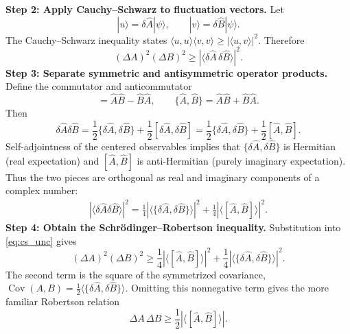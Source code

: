 \documentclass[11pt,a4paper]{article}
\newcommand{\Cov}{\operatorname{Cov}}
\newcommand{\ket}[1]{|#1\rangle}
\newcommand{\abs}[1]{\left|#1\right|}
\begin{document}
\textbf{Step 2: Apply Cauchy--Schwarz to fluctuation vectors.} Let
\begin{equation}
\ket u=\delta\hat A\ket\psi,\qquad \ket v=\delta\hat B\ket\psi.
\end{equation}
The Cauchy--Schwarz inequality states $\langle u,u\rangle\langle v,v\rangle\geq\abs{\langle u,v\rangle}^2$. Therefore
\begin{equation}\label{eq:cs_unc}
\boxed{(\Delta A)^2(\Delta B)^2\geq\abs{\langle\delta\hat A\,\delta\hat B\rangle}^2.}
\end{equation}
\textbf{Step 3: Separate symmetric and antisymmetric operator products.} Define the commutator and anticommutator
\begin{equation}
[\hat A,\hat B]=\hat A\hat B-\hat B\hat A,\qquad\{\hat A,\hat B\}=\hat A\hat B+\hat B\hat A.
\end{equation}
Then
\begin{equation}
\delta\hat A\delta\hat B=\frac12\{\delta\hat A,\delta\hat B\}+\frac12[\delta\hat A,\delta\hat B]
=\frac12\{\delta\hat A,\delta\hat B\}+\frac12[\hat A,\hat B].
\end{equation}
Self-adjointness of the centered observables implies that $\{\delta\hat A,\delta\hat B\}$ is Hermitian (real expectation) and $[\hat A,\hat B]$ is anti-Hermitian (purely imaginary expectation). Thus the two pieces are orthogonal as real and imaginary components of a complex number:
\begin{align}
\abs{\langle\delta\hat A\delta\hat B\rangle}^2
=\frac14\abs{\langle\{\delta\hat A,\delta\hat B\}\rangle}^2
+\frac14\abs{\langle[\hat A,\hat B]\rangle}^2.
\end{align}
\textbf{Step 4: Obtain the Schr\"odinger--Robertson inequality.} Substitution into \eqref{eq:cs_unc} gives
\begin{equation}\label{eq:SR}
\boxed{(\Delta A)^2(\Delta B)^2\geq\frac14\abs{\langle[\hat A,\hat B]\rangle}^2+
\frac14\abs{\langle\{\delta\hat A,\delta\hat B\}\rangle}^2.}
\end{equation}
The second term is the square of the symmetrized covariance, $\Cov(A,B)=\tfrac12\langle\{\delta\hat A,\delta\hat B\}\rangle$. Omitting this nonnegative term gives the more familiar Robertson relation
\begin{equation}\label{eq:robertson}
\boxed{\Delta A\,\Delta B\geq\frac12\abs{\langle[\hat A,\hat B]\rangle}.}
\end{equation}
\end{document}

